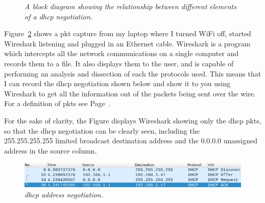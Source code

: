 \documentclass[titlepage]{article}
\begin{document}
\begin{figure}[H]

  \begin{framed}

  \centering

  \end{framed}

  \caption{\textit{%
    A block diagram showing the relationship between
    different elements of a \gls{dhcp} negotiation.
  }}\label{dhcpdiagram}
\end{figure}

Figure~\ref{dhcp_negotiate} shows a \gls{pkt} capture from my laptop where I turned WiFi off, 
started Wireshark listening and plugged in an Ethernet cable. 
Wireshark is a program which intercepts all the network communications
on a single computer and records them to a file\cite{download:wireshark}.
It also displays them to the user, and is capable of performing an analysis and
dissection of each the protocols used.
This means that I can record the \gls{dhcp} negotiation shown below and 
show it to you using Wireshark to get all the information out of the packets
being sent over the wire.
For a definition of \glspl{pkt} see Page~\pageref{packetdef}.

For the sake of clarity, the Figure displays Wireshark showing only the \gls{dhcp} \glspl{pkt},
so that the \gls{dhcp} negotiation can be clearly seen, including the \\
255.255.255.255 limited broadcast destination address
and the 0.0.0.0 unassigned address in the source column.

\begin{figure}[H]
  \centering
  \includegraphics[width=\textwidth]{dhcp_negotiation.png}
  \caption{\textit{\gls{dhcp} address negotiation.}}\label{dhcp_negotiate}
\end{figure}
\end{document}
